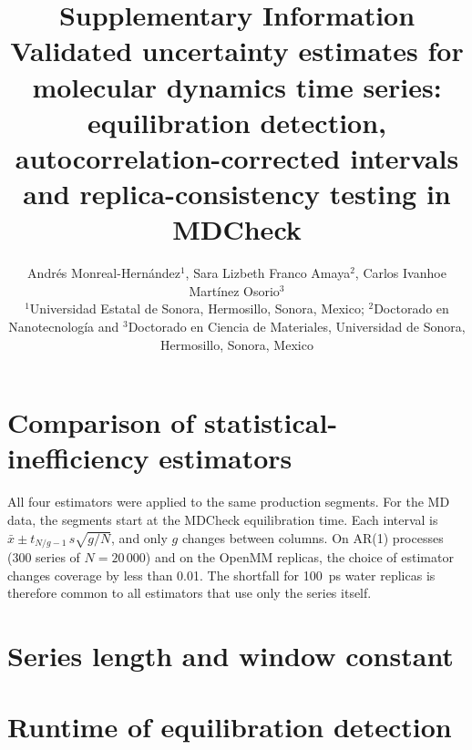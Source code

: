 \documentclass[11pt]{article}
\title{\textbf{Supplementary Information}\\[4pt]\large Validated uncertainty estimates for molecular dynamics time series: equilibration detection, autocorrelation-corrected intervals and replica-consistency testing in MDCheck}
\author{Andr\'es Monreal-Hern\'andez$^{1}$, Sara Lizbeth Franco Amaya$^{2}$, Carlos Ivanhoe Mart\'inez Osorio$^{3}$\\
\small $^{1}$Universidad Estatal de Sonora, Hermosillo, Sonora, Mexico; $^{2}$Doctorado en Nanotecnolog\'ia and $^{3}$Doctorado en Ciencia de Materiales, Universidad de Sonora, Hermosillo, Sonora, Mexico}
\date{}
\newcommand{\tabdir}{tables}
\begin{document}
\maketitle

\section{Comparison of statistical-inefficiency estimators}

All four estimators were applied to the same production segments. For the MD data, the segments start at the MDCheck equilibration time. Each interval is $\bar x \pm t_{N/g-1}\, s\sqrt{g/N}$, and only $g$ changes between columns. On AR(1) processes (300 series of $N = 20\,000$) and on the OpenMM replicas, the choice of estimator changes coverage by less than 0.01. The shortfall for 100~ps water replicas is therefore common to all estimators that use only the series itself.

\begin{table}[h]
\centering\small
\caption{Coverage of the reference (or true) mean and, in parentheses, median $\hat g$ for four inefficiency estimators: the Madras--Sokal self-consistent window with $c=6$ (MDCheck), truncation at the first negative autocorrelation, Geyer's initial monotone sequence, and \texttt{pymbar.timeseries.statistical\_inefficiency}.}

\end{table}

\section{Series length and window constant}

\begin{table}[h]
\centering\small
\caption{Coverage of nominal 95\% intervals for the mean of AR(1) processes against series length (500 series per row). Naive: $\bar x\pm1.96\,s/\sqrt N$. $z$: $\bar x\pm1.96\,s\sqrt{\hat g/N}$. $t$: MDCheck interval with window constant $c$. $N/g$ is the true effective sample size.}
\resizebox{\textwidth}{!}{}
\end{table}

\section{Runtime of equilibration detection}

\begin{table}[h]
\centering\small
\caption{Wall-clock time in seconds, with the detected equilibration time in samples in parentheses, for AR(1) series ($\phi=0.9$) with an exponential transient. MDCheck 1.1 uses the hierarchical search; ``MDCheck 1.0 grid'' is the exhaustive stride-10 search of version 1.0.0; pymbar \texttt{fast} uses \texttt{nskip}$=N/200$. Entries marked -- were not run because they take more than a few minutes. Single core, AMD64 Family 25 Model 33 Stepping 2, AuthenticAMD / Python 3.12.10.}

\end{table}
\end{document}
